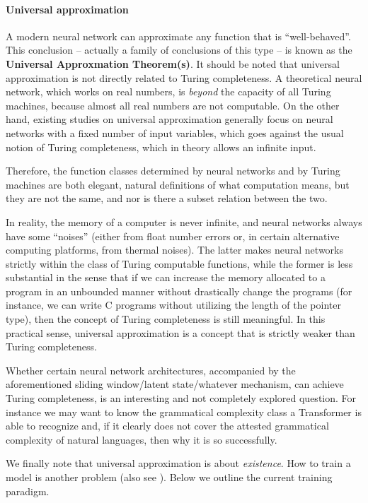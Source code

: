\documentclass[hyperref, a4paper, 12pt]{report}
\newcommand*{\concept}[1]{{\textbf{#1}}}
\begin{document}
\paragraph*{Universal approximation}
A modern neural network can approximate any function that is ``well-behaved''.
This conclusion -- actually a family of conclusions of this type --
is known as the \concept{Universal Approxmation Theorem(s)}.
It should be noted that universal approximation is not directly related to Turing completeness.
A theoretical neural network, which works on real numbers,
is \emph{beyond} the capacity of all Turing machines,
because almost all real numbers are not computable.
On the other hand, existing studies on universal approximation generally focus on
neural networks with a fixed number of input variables,
which goes against the usual notion of Turing completeness,
which in theory allows an infinite input.

Therefore, the function classes determined by neural networks and by Turing machines
are both elegant, natural definitions of what computation means,
but they are not the same, and nor is there a subset relation between the two.

In reality, the memory of a computer is never infinite,
and neural networks always have some ``noises'' (either from float number errors or, in certain alternative computing platforms, from thermal noises).
The latter makes neural networks strictly within the class of Turing computable functions,
while the former is less substantial in the sense that
if we can increase the memory allocated to a program in an unbounded manner 
without drastically change the programs 
(for instance, we can write C programs without utilizing the length of the pointer type),
then the concept of Turing completeness is still meaningful.
In this practical sense, universal approximation is a concept that is strictly weaker than Turing completeness.

Whether certain neural network architectures, accompanied by the aforementioned sliding window/latent state/whatever mechanism, can achieve Turing completeness,
is an interesting and not completely explored question.
For instance we may want to know the grammatical complexity class a Transformer is able to recognize and, if it clearly does not cover the attested grammatical complexity of natural languages, then why it is so successfully.

We finally note that universal approximation is about \emph{existence}.
How to train a model is another problem (also see ). Below we outline the current training paradigm.
\end{document}
